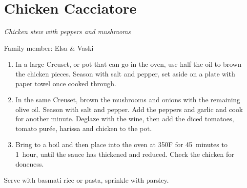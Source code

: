 \chapter{Chicken Cacciatore}
\label{ch:chickencacciatore}


\textit{Chicken stew with peppers and mushrooms}

Family member: Elsa \& Vaski

\begin{enumerate}
    \item In a large Creuset, or pot that can go in the oven, use half the oil to brown the chicken pieces. Season with salt and pepper, set aside on a plate with paper towel once cooked through.
    \item In the same Creuset, brown the mushrooms and onions with the remaining olive oil. Season with salt and pepper. Add the peppers and garlic and cook for another minute. Deglaze with the wine, then add the diced tomatoes, tomato purée, harissa and chicken to the pot.
    \item Bring to a boil and then place into the oven at 350\degree F for 45~minutes to 1~hour, until the sauce has thickened and reduced. Check the chicken for doneness.

\end{enumerate}

Serve with basmati rice or pasta, sprinkle with parsley.
